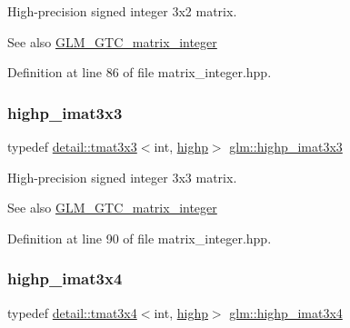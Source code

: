 High-\/precision signed integer 3x2 matrix. \begin{DoxySeeAlso}{See also}
\hyperlink{group__gtc__matrix__integer}{G\+L\+M\+\_\+\+G\+T\+C\+\_\+matrix\+\_\+integer} 
\end{DoxySeeAlso}


Definition at line 86 of file matrix\+\_\+integer.\+hpp.

\mbox{\label{group__gtc__matrix__integer_ga4e7c11e49de5d71067b95a87c84308a8}} 
\subsubsection{\texorpdfstring{highp\+\_\+imat3x3}{highp\_imat3x3}}
{\footnotesize\ttfamily typedef \hyperlink{structglm_1_1detail_1_1tmat3x3}{detail\+::tmat3x3}$<$int, \hyperlink{namespaceglm_a0f04f086094c747d227af4425893f545ac6f7eab42eacbb10d59a58e95e362074}{highp}$>$ \hyperlink{group__gtc__matrix__integer_ga4e7c11e49de5d71067b95a87c84308a8}{glm\+::highp\+\_\+imat3x3}}

High-\/precision signed integer 3x3 matrix. \begin{DoxySeeAlso}{See also}
\hyperlink{group__gtc__matrix__integer}{G\+L\+M\+\_\+\+G\+T\+C\+\_\+matrix\+\_\+integer} 
\end{DoxySeeAlso}


Definition at line 90 of file matrix\+\_\+integer.\+hpp.

\mbox{\label{group__gtc__matrix__integer_ga97ddf84f7ae0c5d4d3ecc18bb1d47449}} 
\subsubsection{\texorpdfstring{highp\+\_\+imat3x4}{highp\_imat3x4}}
{\footnotesize\ttfamily typedef \hyperlink{structglm_1_1detail_1_1tmat3x4}{detail\+::tmat3x4}$<$int, \hyperlink{namespaceglm_a0f04f086094c747d227af4425893f545ac6f7eab42eacbb10d59a58e95e362074}{highp}$>$ \hyperlink{group__gtc__matrix__integer_ga97ddf84f7ae0c5d4d3ecc18bb1d47449}{glm\+::highp\+\_\+imat3x4}}

